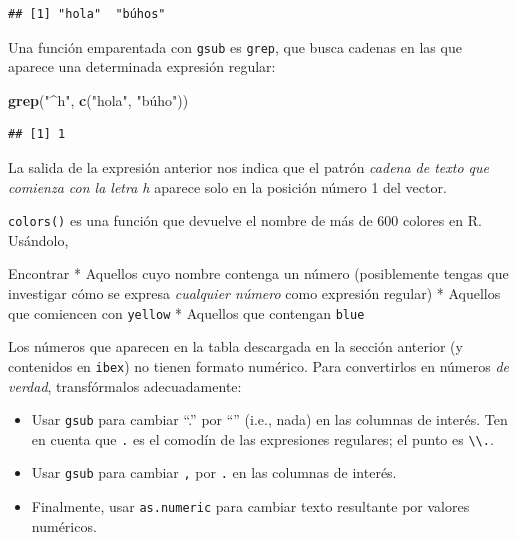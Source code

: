 \documentclass[]{article}
\newenvironment{Shaded}{\begin{snugshade}}{\end{snugshade}}
\newcommand{\KeywordTok}[1]{\textcolor[rgb]{0.13,0.29,0.53}{\textbf{#1}}}
\newcommand{\StringTok}[1]{\textcolor[rgb]{0.31,0.60,0.02}{#1}}
\newcommand{\NormalTok}[1]{#1}
\providecommand{\tightlist}{%
  \setlength{\itemsep}{0pt}\setlength{\parskip}{0pt}}
\newenvironment{ej}{\begin{Shaded}}{\end{Shaded}}
\begin{document}
\begin{Shaded}
\end{Shaded}

\begin{verbatim}
## [1] "hola"  "búhos"
\end{verbatim}

Una función emparentada con \texttt{gsub} es \texttt{grep}, que busca
cadenas en las que aparece una determinada expresión regular:

\begin{Shaded}
\begin{Highlighting}[]
\KeywordTok{grep}\NormalTok{(}\StringTok{"^h"}\NormalTok{, }\KeywordTok{c}\NormalTok{(}\StringTok{"hola"}\NormalTok{, }\StringTok{"búho"))}
\end{Highlighting}
\end{Shaded}

\begin{verbatim}
## [1] 1
\end{verbatim}

La salida de la expresión anterior nos indica que el patrón \emph{cadena
de texto que comienza con la letra h} aparece solo en la posición número
1 del vector.

\begin{ej}
\texttt{colors()} es una función que devuelve el nombre de más de 600
colores en R. Usándolo,

Encontrar * Aquellos cuyo nombre contenga un número (posiblemente tengas
que investigar cómo se expresa \emph{cualquier número} como expresión
regular) * Aquellos que comiencen con \texttt{yellow} * Aquellos que
contengan \texttt{blue}
\end{ej}

\begin{ej}
Los números que aparecen en la tabla descargada en la sección anterior
(y contenidos en \texttt{ibex}) no tienen formato numérico. Para
convertirlos en números \emph{de verdad}, transfórmalos adecuadamente:

\begin{itemize}
\tightlist
\item
  Usar \texttt{gsub} para cambiar ``.'' por ``'' (i.e., nada) en las
  columnas de interés. Ten en cuenta que \texttt{.} es el comodín de las
  expresiones regulares; el punto es
  \texttt{\textbackslash{}\textbackslash{}.}.
\item
  Usar \texttt{gsub} para cambiar \texttt{,} por \texttt{.} en las
  columnas de interés.
\item
  Finalmente, usar \texttt{as.numeric} para cambiar texto resultante por
  valores numéricos.
\end{itemize}
\end{ej}
\end{document}
